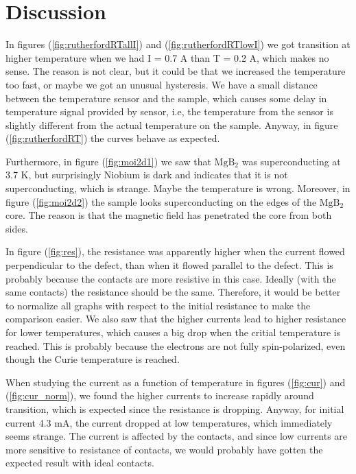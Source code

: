 \documentclass{comjnl}
\newcommand*\chem[1]{\ensuremath{\mathrm{#1}}}
\begin{document}
\section{Discussion} \label{Sec:Discussion}
In figures (\ref{fig:rutherfordRTallI}) and (\ref{fig:rutherfordRTlowI}) we got transition at higher temperature when we had I = 0.7 A than T = 0.2 A, which makes no sense. The reason is not clear, but it could be that we increased the temperature too fast, or maybe we got an unusual hysteresis. We have a small distance between the temperature sensor and the sample, which causes some delay in temperature signal provided by sensor, i.e, the temperature from the sensor is slightly different from the actual temperature on the sample. Anyway, in figure (\ref{fig:rutherfordRT}) the curves behave as expected. 

Furthermore, in figure (\ref{fig:moi2d1}) we saw that \chem{MgB_2} was superconducting at 3.7 K, but surprisingly Niobium is dark and indicates that it is not superconducting, which is strange. Maybe the temperature is wrong. Moreover, in figure (\ref{fig:moi2d2}) the sample looks superconducting on the edges of the \chem{MgB_2} core. The reason is that the magnetic field has penetrated the core from both sides. 

In figure (\ref{fig:res}), the resistance was apparently higher when the current flowed perpendicular to the defect, than when it flowed parallel to the defect. This is probably because the contacts are more resistive in this case. Ideally (with the same contacts) the resistance should be the same. Therefore, it would be better to normalize all graphs with respect to the initial resistance to make the comparison easier. We also saw that the higher currents lead to higher resistance for lower temperatures, which causes a big drop when the critial temperature is reached. This is probably because the electrons are not fully spin-polarized, even though the Curie temperature is reached. 

When studying the current as a function of temperature in figures (\ref{fig:cur}) and (\ref{fig:cur_norm}), we found the higher currents to increase rapidly around transition, which is expected since the resistance is dropping. Anyway, for initial current 4.3 mA, the current dropped at low temperatures, which immediately seems strange. The current is affected by the contacts, and since low currents are more sensitive to resistance of contacts, we would probably have gotten the expected result with ideal contacts. 
\end{document}
